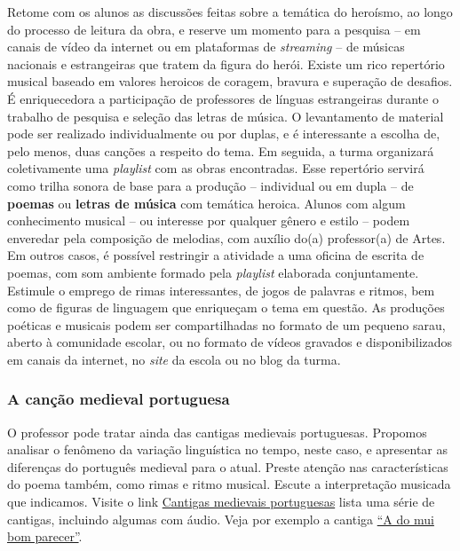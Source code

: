 \documentclass[11pt]{extarticle}
\begin{document}
  Retome com os alunos as discussões feitas sobre a temática do
  heroísmo, ao longo do processo de leitura da obra, e reserve um
  momento para a pesquisa -- em canais de vídeo da internet ou em
  plataformas de \emph{streaming} -- de músicas nacionais e estrangeiras
  que tratem da figura do herói. Existe um rico repertório musical
  baseado em valores heroicos de coragem, bravura e superação de
  desafios. É enriquecedora a participação de professores de línguas
  estrangeiras durante o trabalho de pesquisa e seleção das letras de
  música. O levantamento de material pode ser realizado individualmente
  ou por duplas, e é interessante a escolha de, pelo menos, duas canções
  a respeito do tema. Em seguida, a turma organizará coletivamente uma
  \emph{playlist} com as obras encontradas. Esse repertório servirá como
  trilha sonora de base para a produção -- individual ou em dupla -- de
  \textbf{poemas} ou \textbf{letras de música} com temática heroica.
  Alunos com algum conhecimento musical -- ou interesse por qualquer
  gênero e estilo -- podem enveredar pela composição de melodias, com
  auxílio do(a) professor(a) de Artes. Em outros casos, é possível
  restringir a atividade a uma oficina de escrita de poemas, com som
  ambiente formado pela \emph{playlist} elaborada conjuntamente.
  Estimule o emprego de rimas interessantes, de jogos de palavras e
  ritmos, bem como de figuras de linguagem que enriqueçam o tema em
  questão. As produções poéticas e musicais podem ser compartilhadas no
  formato de um pequeno sarau, aberto à comunidade escolar, ou no
  formato de vídeos gravados e disponibilizados em canais da internet,
  no \emph{site} da escola ou no blog da turma.


\subsubsection{A canção medieval portuguesa}

  O professor pode tratar ainda das cantigas medievais portuguesas. 
  Propomos analisar o fenômeno da variação linguística no tempo, neste caso, 
  e apresentar as diferenças do português medieval para o atual. Preste atenção 
  nas características do poema também, como rimas e ritmo musical. Escute 
  a interpretação musicada que indicamos. 
  Visite o link \href{https://cantigas.fcsh.unl.pt/listacantigas.asp}{Cantigas
  medievais portuguesas} lista uma série de cantigas, incluindo algumas
  com áudio. Veja por exemplo a cantiga 
  \href{https://cantigas.fcsh.unl.pt/versaomusical.asp?cdcant=1307&cdvm=247}{``A do mui bom parecer''}.
\end{document}

